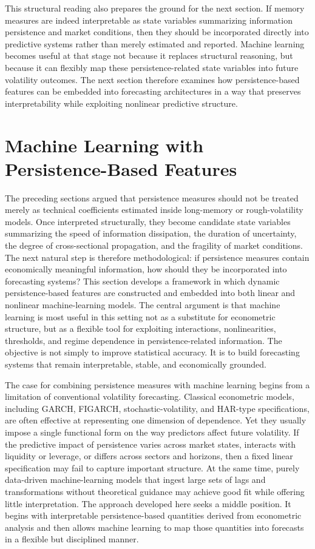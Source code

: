 \documentclass[12pt]{article}
\begin{document}
This structural reading also prepares the ground for the next section. If memory measures are indeed interpretable as state variables summarizing information persistence and market conditions, then they should be incorporated directly into predictive systems rather than merely estimated and reported. Machine learning becomes useful at that stage not because it replaces structural reasoning, but because it can flexibly map these persistence-related state variables into future volatility outcomes. The next section therefore examines how persistence-based features can be embedded into forecasting architectures in a way that preserves interpretability while exploiting nonlinear predictive structure.



\section{Machine Learning with Persistence-Based Features}
\label{sec:ml}

The preceding sections argued that persistence measures should not be treated merely as technical coefficients estimated inside long-memory or rough-volatility models. Once interpreted structurally, they become candidate state variables summarizing the speed of information dissipation, the duration of uncertainty, the degree of cross-sectional propagation, and the fragility of market conditions. The next natural step is therefore methodological: if persistence measures contain economically meaningful information, how should they be incorporated into forecasting systems? This section develops a framework in which dynamic persistence-based features are constructed and embedded into both linear and nonlinear machine-learning models. The central argument is that machine learning is most useful in this setting not as a substitute for econometric structure, but as a flexible tool for exploiting interactions, nonlinearities, thresholds, and regime dependence in persistence-related information. The objective is not simply to improve statistical accuracy. It is to build forecasting systems that remain interpretable, stable, and economically grounded.

The case for combining persistence measures with machine learning begins from a limitation of conventional volatility forecasting. Classical econometric models, including GARCH, FIGARCH, stochastic-volatility, and HAR-type specifications, are often effective at representing one dimension of dependence. Yet they usually impose a single functional form on the way predictors affect future volatility. If the predictive impact of persistence varies across market states, interacts with liquidity or leverage, or differs across sectors and horizons, then a fixed linear specification may fail to capture important structure. At the same time, purely data-driven machine-learning models that ingest large sets of lags and transformations without theoretical guidance may achieve good fit while offering little interpretation. The approach developed here seeks a middle position. It begins with interpretable persistence-based quantities derived from econometric analysis and then allows machine learning to map those quantities into forecasts in a flexible but disciplined manner.
\end{document}
